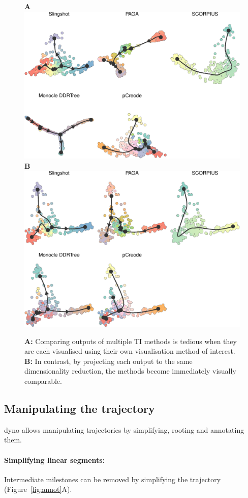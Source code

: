\begin{figure}[ht!]
	\centering
	\textbf{A}\includegraphics[width=.6\linewidth,valign=t]{manuscript_files/figure-latex/dimreds-1.pdf}\\\vspace*{1em}
	\textbf{B}\includegraphics[width=.6\linewidth,valign=t]{manuscript_files/figure-latex/dimredscommon-1.pdf}
	\caption{
		\textbf{A:} Comparing outputs of multiple TI methods is tedious when they are each visualised using their own visualisation method of interest.
		\textbf{B:} In contrast, by projecting each output to the same dimensionality reduction, the methods become immediately visually comparable.
	}
	\label{fig:compare}
\end{figure}






\subsection{Manipulating the trajectory}
{dyno} allows manipulating trajectories by simplifying, rooting and annotating them.

\paragraph{Simplifying linear segments:} Intermediate milestones can be removed by simplifying the trajectory (Figure~\ref{fig:annot}A).


